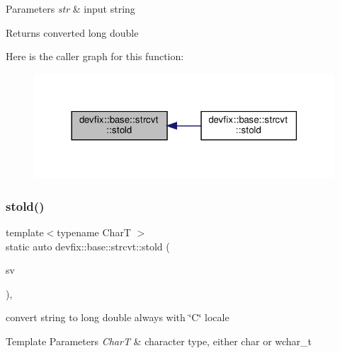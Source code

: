 \begin{DoxyParams}{Parameters}
{\em str} & input string \\
\hline
\end{DoxyParams}
\begin{DoxyReturn}{Returns}
converted long double 
\end{DoxyReturn}
Here is the caller graph for this function\+:
\nopagebreak
\begin{figure}[H]
\begin{center}
\leavevmode
\includegraphics[width=318pt]{structdevfix_1_1base_1_1strcvt_a387c5ad278f568abb921df0ebac489c3_icgraph}
\end{center}
\end{figure}
\mbox{\label{structdevfix_1_1base_1_1strcvt_acd3c558da236cbab738a9014df5979ac}} 
\subsubsection{\texorpdfstring{stold()}{stold()}\hspace{0.1cm}{\footnotesize\ttfamily [2/2]}}
{\footnotesize\ttfamily template$<$typename CharT $>$ \\
static auto devfix\+::base\+::strcvt\+::stold (\begin{DoxyParamCaption}\item[{std\+::basic\+\_\+string\+\_\+view$<$ CharT $>$}]{sv }\end{DoxyParamCaption})\hspace{0.3cm}{\ttfamily [inline]}, {\ttfamily [static]}}



convert string to long double always with \char`\"{}\+C\char`\"{} locale 


\begin{DoxyTemplParams}{Template Parameters}
{\em CharT} & character type, either \textquotesingle{}char\textquotesingle{} or \textquotesingle{}wchar\+\_\+t\textquotesingle{} \\
\hline
\end{DoxyTemplParams}

